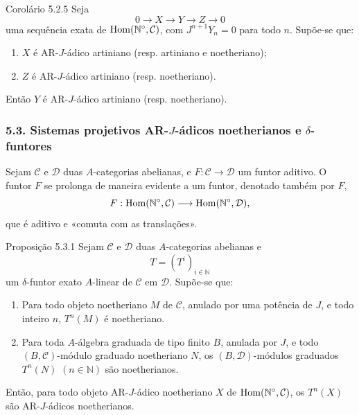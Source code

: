 \begin{statement}{Corolário 5.2.5}
Seja
\[
0\longrightarrow X\longrightarrow Y\longrightarrow Z\longrightarrow0
\]
uma sequência exata de \(\operatorname{Hom}(\mathbb N^\circ,\mathcal C)\), com \(J^{n+1}Y_n=0\) para todo \(n\). Supõe-se que:
\begin{enumerate}[label=\textup{(\roman*)}]
\item \(X\) é AR-\(J\)-ádico artiniano (resp. artiniano e noetheriano);
\item \(Z\) é AR-\(J\)-ádico artiniano (resp. noetheriano).
\end{enumerate}
Então \(Y\) é AR-\(J\)-ádico artiniano (resp. noetheriano).
\end{statement}

\subsubsection*{5.3. Sistemas projetivos AR-\(J\)-ádicos noetherianos e \(\delta\)-funtores}

Sejam \(\mathcal C\) e \(\mathcal D\) duas \(A\)-categorias abelianas, e \(F:\mathcal C\to\mathcal D\) um funtor aditivo. O funtor \(F\) se prolonga de maneira evidente a um funtor, denotado também por \(F\),
\[
F:\operatorname{Hom}(\mathbb N^\circ,\mathcal C)\longrightarrow\operatorname{Hom}(\mathbb N^\circ,\mathcal D),
\]
que é aditivo e «comuta com as translações».

\begin{statement}{Proposição 5.3.1}
Sejam \(\mathcal C\) e \(\mathcal D\) duas \(A\)-categorias abelianas e
\[
T=(T^i)_{i\in\mathbb N}
\]
um \(\delta\)-funtor exato \(A\)-linear de \(\mathcal C\) em \(\mathcal D\). Supõe-se que:
\begin{enumerate}[label=\textup{(\roman*)}]
\item Para todo objeto noetheriano \(M\) de \(\mathcal C\), anulado por uma potência de \(J\), e todo inteiro \(n\), \(T^n(M)\) é noetheriano.
\item Para toda \(A\)-álgebra graduada de tipo finito \(B\), anulada por \(J\), e todo \((B,\mathcal C)\)-módulo graduado noetheriano \(N\), os \((B,\mathcal D)\)-módulos graduados \(T^n(N)\) \((n\in\mathbb N)\) são noetherianos.
\end{enumerate}
Então, para todo objeto AR-\(J\)-ádico noetheriano \(X\) de \(\operatorname{Hom}(\mathbb N^\circ,\mathcal C)\), os \(T^n(X)\) são AR-\(J\)-ádicos noetherianos.
\end{statement}
